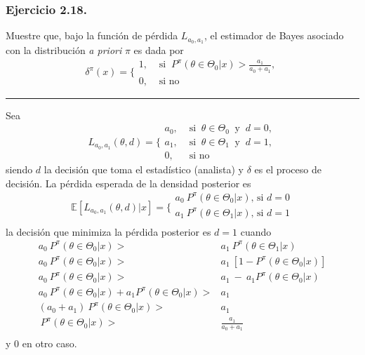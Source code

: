 \documentclass[12pt,]{article}
\begin{document}
\subsubsection{Ejercicio 2.18.}\label{ejercicio-2.18.}

Muestre que, bajo la función de pérdida \(L_{a_0,a_1}\), el estimador de
Bayes asociado con la distribución \emph{a priori} \(\pi\) es dada por
\[
\delta^\pi(x)=\Bigg\{
\begin{array}{ll}
1, &\text{ si }\ P^\pi(\theta\in\Theta_0|x)>\displaystyle \frac{a_1}{a_0+a_1},\\
0,&\text{ si no }
\end{array}
\]

\begin{center}\rule{0.5\linewidth}{\linethickness}\end{center}

Sea \[
L_{a_0,a_1}(\theta,d)= \Bigg \{
\begin{array}{ll}
a_0, &\text{ si }\ \theta\in\Theta_0\ \text{ y }\ d=0,\\
a_1, &\text{ si }\ \theta\in\Theta_1\ \text{ y }\ d=1,\\
0,&\text{ si no }
\end{array}
\] siendo \(d\) la decisión que toma el estadístico (analista) y
\(\delta\) es el proceso de decisión. La pérdida esperada de la densidad
posterior es \[
\mathbb{E}[L_{a_0,a_1}(\theta,d)|x] = \bigg\{
\begin{array}{rl}
a_0\ P^\pi(\theta\in\Theta_0|x)\text{, si } d=0\\
a_1\ P^\pi(\theta\in\Theta_1|x)\text{, si } d=1\\
\end{array}
\] la decisión que minimiza la pérdida posterior es \(d=1\) cuando \[
\begin{array}{rl}
a_0\ P^\pi(\theta\in\Theta_0|x) > & a_1\ P^\pi(\theta\in\Theta_1|x) \\
a_0\ P^\pi(\theta\in\Theta_0|x) > & a_1\ [1-P^\pi(\theta\in\Theta_0|x)]\\
a_0\ P^\pi(\theta\in\Theta_0|x) > & a_1\ -\ a_1P^\pi(\theta\in\Theta_0|x)\\
a_0\ P^\pi(\theta\in\Theta_0|x) + a_1P^\pi(\theta\in\Theta_0|x) > & a_1\ \\
(a_0+a_1)\ P^\pi(\theta\in\Theta_0|x) > & a_1\ \\
\ P^\pi(\theta\in\Theta_0|x) > & \displaystyle\frac{a_1}{a_0+a_1}\ \\
\end{array}
\] y \(0\) en otro caso.
\end{document}
